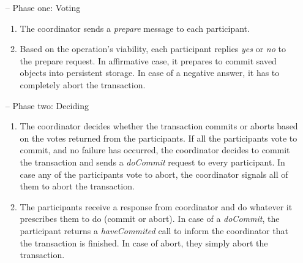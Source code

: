 \documentclass[times, 10pt,twocolumn]{article}
\begin{document}
\begin{itemize}

\item[--] Phase one: Voting

\begin{enumerate}
	
\item The coordinator sends a \emph{prepare} message to each participant.

\item Based on the operation's viability, each participant replies \emph{yes} or \emph{no} to the prepare request. In affirmative case, it prepares to commit saved objects into persistent storage. In case of a negative answer, it has to completely abort the transaction.

\end{enumerate}

\item[--] Phase two: Deciding

\begin{enumerate}

\item The coordinator decides whether the transaction commits or aborts based on the votes returned from the participants. If all the participants vote to commit, and no failure has occurred, the coordinator decides to commit the transaction and sends a \emph{doCommit} request to every participant. In case any of the participants vote to abort, the coordinator signals all of them to abort the transaction.

\item The participants receive a response from coordinator and do whatever it prescribes them to do (commit or abort). In case of a \emph{doCommit}, the participant returns a \emph{haveCommited} call to inform the coordinator that the transaction is finished. In case of abort, they simply abort the transaction.

\end{enumerate}

\end{itemize}
\end{document}
